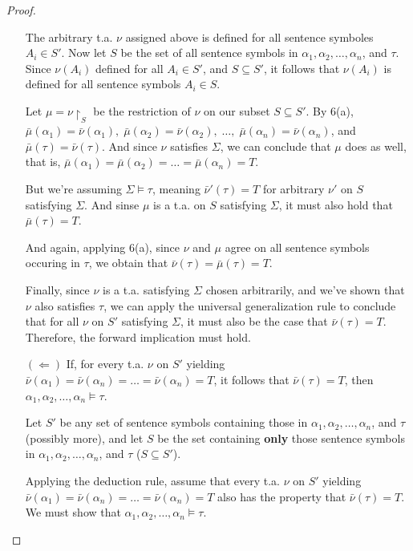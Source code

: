 \documentclass[11pt]{article}
\newcommand{\n}{\vspace{0.5cm}}
\begin{document}
\begin{proof}
\begin{enumerate}
        The arbitrary t.a. \(\nu\) assigned above is defined for all sentence symboles \(A_i \in S'\).  Now let \(S\) be the set of all sentence symbols in \(\alpha_1, \alpha_2, \hdots, \alpha_n\), and \(\tau\).  Since \(\nu(A_i)\) defined for all \(A_i \in S'\), and \(S \subseteq S'\), it follows that \(\nu(A_i)\) is defined for all sentence symbols \(A_i \in S\). \n

        Let \(\mu = \nu\restriction_S\) be the restriction of \(\nu\) on our subset \(S \subseteq S'\).  By 6(a), \(\bar\mu(\alpha_1) = \bar\nu(\alpha_1), \; \bar\mu(\alpha_2) = \bar\nu(\alpha_2), \; \hdots, \; \bar\mu(\alpha_n) = \bar\nu(\alpha_n)\), and \(\bar\mu(\tau) = \bar\nu(\tau)\).  And since \(\nu\) satisfies \(\Sigma\), we can conclude that \(\mu\) does as well, that is, \(\bar\mu(\alpha_1) = \bar\mu(\alpha_2) = \hdots = \bar\mu(\alpha_n) = T\). \n

        But we're assuming \(\Sigma \vDash \tau\), meaning \(\bar\nu'(\tau) = T\) for arbitrary \(\nu'\) on \(S\) satisfying \(\Sigma\).  And sinse \(\mu\) is a t.a. on \(S\) satisfying \(\Sigma\), it must also hold that \(\bar\mu(\tau) = T\). \n

        And again, applying 6(a), since \(\nu\) and \(\mu\) agree on all sentence symbols occuring in \(\tau\), we obtain that \(\bar\nu(\tau) = \bar\mu(\tau) = T\). \n

        Finally, since \(\nu\) is a t.a. satisfying \(\Sigma\) chosen arbitrarily, and we've shown that \(\nu\) also satisfies \(\tau\), we can apply the universal generalization rule to conclude that for all \(\nu\) on \(S'\) satisfying \(\Sigma\), it must also be the case that \(\bar\nu(\tau) = T\).  Therefore, the forward implication must hold.

      \item[\((\Leftarrow)\)] If, for every t.a. \(\nu\) on \(S'\) yielding \(\bar\nu(\alpha_1) = \bar\nu(\alpha_n) = \hdots = \bar\nu(\alpha_n) = T\), it follows that \(\bar\nu(\tau) = T\), then \(\alpha_1, \alpha_2, \hdots, \alpha_n \vDash \tau\). \n

        Let \(S'\) be any set of sentence symbols containing those in \(\alpha_1, \alpha_2, \hdots, \alpha_n\), and \(\tau\) (possibly more), and let \(S\) be the set containing \textbf{only} those sentence symbols in \(\alpha_1, \alpha_2, \hdots, \alpha_n\), and \(\tau\) (\(S \subseteq S'\)). \n

        Applying the deduction rule, assume that every t.a. \(\nu\) on \(S'\) yielding \(\bar\nu(\alpha_1) = \bar\nu(\alpha_n) = \hdots = \bar\nu(\alpha_n) = T\) also has the property that \(\bar\nu(\tau) = T\).  We must show that \(\alpha_1, \alpha_2, \hdots, \alpha_n \vDash \tau\). \n


\end{enumerate}
\end{proof}
\end{document}
